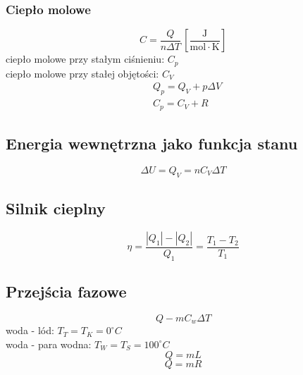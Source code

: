 \documentclass{article}
\numberwithin{equation}{section}
\newcommand{\unit}[1]{\, \left[\mathrm{#1}\right]}
\begin{document}
      \subsubsection{Ciepło molowe}
        \begin{equation}
          C = \frac{Q}{n\Delta T} \unit{\frac{J}{mol\cdot K}}
        \end{equation}
        ciepło molowe przy stałym ciśnieniu: $C_p$\\
        ciepło molowe przy stałej objętości: $C_V$
        \begin{align}
          &Q_p = Q_V + p\Delta V\\
          &C_p = C_V + R
        \end{align}
    \subsection{Energia wewnętrzna jako funkcja stanu}
      \begin{equation}
        \Delta U = Q_V = nC_V\Delta T
      \end{equation}
      \subsection{Silnik cieplny}
        \begin{center}
        \end{center}
      \begin{equation}
        \eta = \frac{|Q_1|-|Q_2|}{Q_1} = \frac{T_1 - T_2}{T_1}
      \end{equation}
    \subsection{Przejścia fazowe}
      \begin{equation}
        Q - mC_w\Delta T
      \end{equation}
      woda - lód: $T_T = T_K = 0^\circ C$\\
      woda - para wodna: $T_W = T_S = 100^\circ C$
      \begin{equation}
        Q = mL
      \end{equation}
      \begin{equation}
        Q = mR
      \end{equation}
\end{document}
